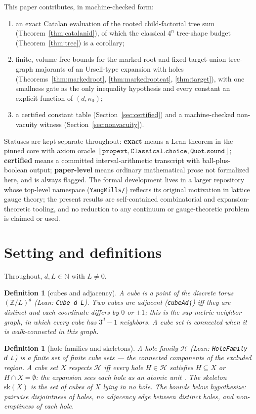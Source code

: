 \documentclass[11pt]{article}
\newtheorem{definition}[theorem]{Definition}
\newcommand{\lean}[1]{\texttt{#1}}
\newcommand{\ZL}{\mathbb{Z}/L}
\newcommand{\holes}{\mathcal{H}}
\newcommand{\skel}{\mathrm{sk}}
\begin{document}
This paper contributes, in machine-checked form:
\begin{enumerate}
\item an exact Catalan evaluation of the rooted child-factorial tree
  sum (Theorem~\ref{thm:catalanid}), of which the classical $4^n$
  tree-shape budget (Theorem~\ref{thm:tree}) is a corollary;
\item finite, volume-free bounds for the marked-root and
  fixed-target-union tree-graph majorants of an Ursell-type
  expansion with holes (Theorems~\ref{thm:markedroot},
  \ref{thm:markedrootcat}, \ref{thm:target}), with one smallness
  gate as the only inequality hypothesis and every constant an
  explicit function of $(d, \kappa_0)$;
\item a certified constant table (Section~\ref{sec:certified}) and a
  machine-checked non-vacuity witness (Section~\ref{sec:nonvacuity}).
\end{enumerate}
Statuses are kept separate throughout: \textbf{exact} means a Lean
theorem in the pinned core with axiom oracle
$[\lean{propext}, \lean{Classical.choice}, \lean{Quot.sound}]$;
\textbf{certified} means a committed interval-arithmetic transcript
with ball-plus-boolean output; \textbf{paper-level} means ordinary
mathematical prose not formalized here, and is always flagged.  The
formal development lives in a larger repository whose top-level
namespace (\lean{YangMills/}) reflects its original motivation in
lattice gauge theory; the present results are self-contained
combinatorial and expansion-theoretic tooling, and no reduction to
any continuum or gauge-theoretic problem is claimed or used.

\section{Setting and definitions}\label{sec:setting}

Throughout, $d, L \in \mathbb{N}$ with $L \ne 0$.

\begin{definition}[cubes and adjacency]
A \emph{cube} is a point of the discrete torus $(\ZL)^d$ (Lean:
\lean{Cube d L}).  Two cubes are \emph{adjacent} (\lean{cubeAdj})
iff they are distinct and each coordinate differs by $0$ or $\pm 1$;
this is the sup-metric neighbor graph, in which every cube has
$3^d - 1$ neighbors.  A cube set is \emph{connected} when it is
walk-connected in this graph.
\end{definition}

\begin{definition}[hole families and skeletons]\label{def:holes}
A \emph{hole family} $\holes$ (Lean: \lean{HoleFamily d L}) is a
finite set of finite cube sets --- the connected components of the
excluded region.  A cube set $X$ \emph{respects} $\holes$ iff every
hole $H \in \holes$ satisfies $H \subseteq X$ or $H \cap X =
\emptyset$: the expansion sees each hole as an atomic unit
\cite[eq.~(149)]{DimockII}.  The \emph{skeleton} $\skel(X)$ is the
set of cubes of $X$ lying in no hole.  The bounds below hypothesize:
pairwise disjointness of holes, no adjacency edge between distinct
holes, and non-emptiness of each hole.
\end{definition}
\end{document}
